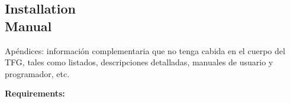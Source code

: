 \documentclass[12pt, a4paper, twoside]{article}
\begin{document}
\newpage

\begin{umaappendices}
\section{Installation \\ Manual}
Apéndices: información complementaria que no tenga cabida en el cuerpo del TFG, tales como listados, descripciones detalladas, manuales de usuario y programador, etc. 
    
    \textbf{\large{Requirements:}}
    
    \blindtext

\end{umaappendices}
\end{document}
